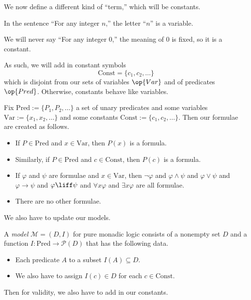 We now define a different kind of ``term,'' which will be constants.
\begin{example}
	In the sentence ``For any integer $n$,'' the letter ``$n$'' is a variable.
\end{example}
\begin{example}
	We will never say ``For any integer $0$,'' the meaning of $0$ is fixed, so it is a constant.
\end{example}
As such, we will add in constant symbols
\[\mathrm{Const}=\{c_1,c_2,\ldots\}\]
which is disjoint from our sets of variables $\op{Var}$ and of predicates $\op{Pred}$. Otherwise, constants behave like variables.
\begin{defihelper} \label{def:formulawithconsts}
	Fix $\mathrm{Pred}:=\{P_1,P_2,\ldots\}$ a set of unary predicates and some variables $\mathrm{Var}:=\{x_1,x_2,\ldots\}$ and some constants $\mathrm{Const}:=\{c_1,c_2,\ldots\}$. Then our formulae are created as follows.
	\begin{itemize}
		\item If $P\in\mathrm{Pred}$ and $x\in\mathrm{Var}$, then $P(x)$ is a formula.
		\item Similarly, if $P\in\mathrm{Pred}$ and $c\in\mathrm{Const}$, then $P(c)$ is a formula.
		\item If $\varphi$ and $\psi$ are formulae and $x\in\mathrm{Var}$, then $\lnot\varphi$ and $\varphi\land\psi$ and $\varphi\lor\psi$ and $\varphi\to\psi$ and $\varphi\liff\psi$ and $\forall x\varphi$ and $\exists x\varphi$ are all formulae.
		\item There are no other formulae.
	\end{itemize}
\end{defihelper}
We also have to update our models.
\begin{defihelper}[Model]
	A \textit{model} $\mathcal M=(D,I)$ for pure monadic logic consists of a nonempty set $D$ and a function $I:\mathrm{Pred}\to\mathcal P(D)$ that has the following data.
	\begin{itemize}
		\item Each predicate $A$ to a subset $I(A)\subseteq D$.
		\item We also have to assign $I(c)\in D$ for each $c\in\mathrm{Const}$.
	\end{itemize}
\end{defihelper}
Then for validity, we also have to add in our constants.
